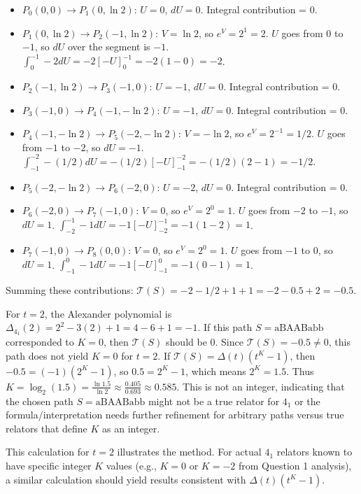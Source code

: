 \documentclass{article}
\begin{document}
\begin{itemize}
    \item $P_0(0,0) \to P_1(0, \ln 2)$: $U=0$, $dU=0$. Integral contribution = $0$.
    \item $P_1(0, \ln 2) \to P_2(-1, \ln 2)$: $V=\ln 2$, so $e^V = 2^1 = 2$. $U$ goes from $0$ to $-1$, so $dU$ over the segment is $-1$. $\int_0^{-1} -2 dU = -2 [-U]_0^{-1} = -2(1-0) = -2$.
    \item $P_2(-1, \ln 2) \to P_3(-1, 0)$: $U=-1$, $dU=0$. Integral contribution = $0$.
    \item $P_3(-1, 0) \to P_4(-1, -\ln 2)$: $U=-1$, $dU=0$. Integral contribution = $0$.
    \item $P_4(-1, -\ln 2) \to P_5(-2, -\ln 2)$: $V=-\ln 2$, so $e^V = 2^{-1} = 1/2$. $U$ goes from $-1$ to $-2$, so $dU = -1$. $\int_{-1}^{-2} -(1/2) dU = -(1/2) [-U]_{-1}^{-2} = -(1/2)(2-1) = -1/2$.
    \item $P_5(-2, -\ln 2) \to P_6(-2, 0)$: $U=-2$, $dU=0$. Integral contribution = $0$.
    \item $P_6(-2, 0) \to P_7(-1, 0)$: $V=0$, so $e^V = 2^0 = 1$. $U$ goes from $-2$ to $-1$, so $dU = 1$. $\int_{-2}^{-1} -1 dU = -1 [-U]_{-2}^{-1} = -1(1-2) = 1$.
    \item $P_7(-1, 0) \to P_8(0, 0)$: $V=0$, so $e^V = 2^0 = 1$. $U$ goes from $-1$ to $0$, so $dU = 1$. $\int_{-1}^{0} -1 dU = -1 [-U]_{-1}^{0} = -1(0-1) = 1$.
\end{itemize}
Summing these contributions: $\mathcal{T}(S) = -2 - 1/2 + 1 + 1 = -2 - 0.5 + 2 = -0.5$.

For $t=2$, the Alexander polynomial is $\Delta_{4_1}(2) = 2^2 - 3(2) + 1 = 4 - 6 + 1 = -1$.
If this path $S = \text{aBAABabb}$ corresponded to $K=0$, then $\mathcal{T}(S)$ should be $0$. Since $\mathcal{T}(S) = -0.5 \neq 0$, this path does not yield $K=0$ for $t=2$. If $\mathcal{T}(S) = \Delta(t)(t^K-1)$, then $-0.5 = (-1)(2^K-1)$, so $0.5 = 2^K-1$, which means $2^K = 1.5$. Thus $K = \log_2(1.5) = \frac{\ln 1.5}{\ln 2} \approx \frac{0.405}{0.693} \approx 0.585$. This is not an integer, indicating that the chosen path $S = \text{aBAABabb}$ might not be a true relator for $4_1$ or the formula/interpretation needs further refinement for arbitrary paths versus true relators that define $K$ as an integer.

This calculation for $t=2$ illustrates the method. For actual $4_1$ relators known to have specific integer $K$ values (e.g., $K=0$ or $K=-2$ from Question 1 analysis), a similar calculation should yield results consistent with $\Delta(t)(t^K-1)$.
\end{document}
